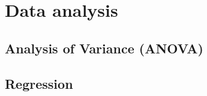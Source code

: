 %
%   
\clearpage
\section{Data analysis}
\subsection{Analysis of Variance (ANOVA)}
\subsection{Regression}